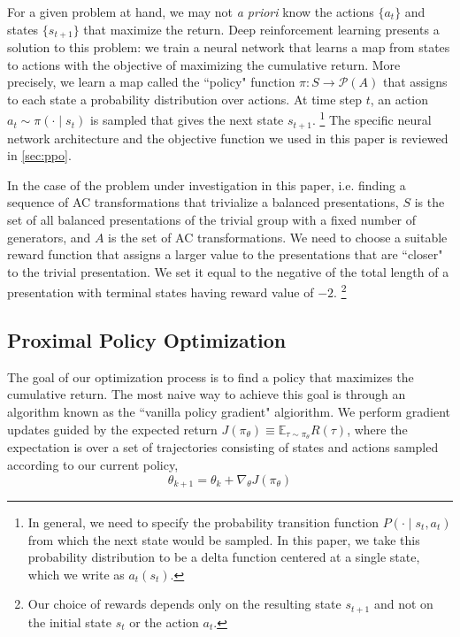 For a given problem at hand, we may not \textit{a priori} know the actions $\{a_t\}$ and states $\{s_{t+1}\}$ that maximize the return. Deep reinforcement learning presents a solution to this problem: we train a neural network that learns a map from states to actions with the objective of maximizing the cumulative return. More precisely, we learn a map called the ``policy" function $\pi : S \to \mathcal{P}(A)$ that assigns to each state a probability distribution over actions. At time step $t$, an action $a_t \sim \pi(\cdot \mid s_t)$ is sampled that gives the next state $s_{t+1}$.
\footnote{In general, we need to specify the probability transition function $P(\cdot \mid s_t, a_t)$  from which the next state would be sampled. In this paper, we take this probability distribution to be a delta function centered at a single state, which we write as $a_t(s_t)$.} 
The specific neural network architecture and the objective function we used in this paper is reviewed in \autoref{sec:ppo}.
\newline 

In the case of the problem under investigation in this paper, i.e. finding a sequence of AC transformations that trivialize a balanced presentations, $S$ is the set of all balanced presentations of the trivial group with a fixed number of generators, and $A$ is the set of AC transformations. We need to choose a suitable reward function that assigns a larger value to the presentations that are ``closer" to the trivial presentation. We set it equal to the negative of the total length of a presentation with terminal states having reward value of $-2$.
\footnote{Our choice of rewards depends only on the resulting state $s_{t+1}$ and not on the initial state $s_t$ or the action $a_t$.}
\newline



\subsection{Proximal Policy Optimization} \label{sec:ppo}

The goal of our optimization process is to find a policy that maximizes the cumulative return. The most naive way to achieve this goal is through an algorithm known as the ``vanilla policy gradient" algiorithm. We perform gradient updates guided by the expected return $J(\pi_\theta) \equiv \mathbb{E}_{\tau \sim \pi_\theta} R(\tau)$, where the expectation is over a set of trajectories consisting of states and actions sampled according to our current policy, 
\[
\theta_{k+1} = \theta_k + \nabla_\theta J(\pi_\theta)
\]

